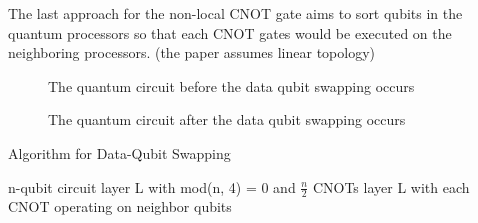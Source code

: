 The last approach for the non-local CNOT gate aims to sort qubits in the quantum processors so that each CNOT gates would be executed on the neighboring processors. (the paper \cite{distributedquantumcompiler} assumes linear topology)

\begin{figure}[ht]
  	\begin{center}

		\caption{The quantum circuit before the data qubit swapping occurs}
	\end{center}
\end{figure}
	
\begin{figure}[ht]
  	\begin{center}
		\caption{The quantum circuit after the data qubit swapping occurs}
	\end{center}
\end{figure}

\begin{algorithm}
 \caption{Algorithm for Data-Qubit Swapping}
 \begin{algorithmic}[1]
  \Require n-qubit circuit layer L with mod(n, 4) = 0 and $\frac{n}{2}$ CNOTs
  \Ensure  layer L with each CNOT operating on neighbor qubits
    \Else
    \EndIf
    
    \EndIf
    
\EndFunction

 \end{algorithmic} 
 \end{algorithm}

